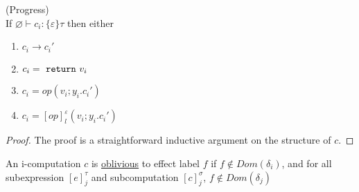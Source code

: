 \begin{lemma} (Progress) \\
If $\varnothing \vdash c_i : \{\varepsilon\} \tau$ then either
\begin{enumerate}
\item  $c_i \longrightarrow c_i'$ 
\item  $c_i = \ \texttt{return}\  v_i$
\item $c_i = op(v_i; y_i.c_i')$
\item $c_i = [op]^\varepsilon_l(v_i; y_i.c_i')$
 \end{enumerate}
\begin{proof}
The proof is a straightforward inductive argument on the structure of $c$.
\end{proof}

\end{lemma}







\begin{definition}
An  i-computation $c$ is \underline{oblivious} to effect label $f$ if $f \not\in Dom(\delta_i)$, and for all subexpression $[e]^\tau_j$ and subcomputation $[c]^\sigma_j$, $f \not\in Dom(\delta_j)$
\end{definition}


